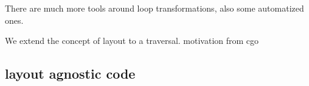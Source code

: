 There are much more tools around loop transformations, also some automatized ones.

We extend the concept of layout to a traversal. motivation from cgo









\subsection{layout agnostic code}



